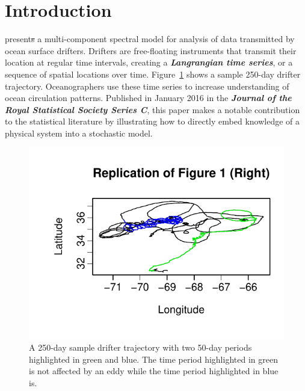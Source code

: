\documentclass{stat572Style}
\newcommand{\vmdel}[1]{\sout{#1}}
\begin{document}
\section{Introduction}
\citet{Sykulski2016} present\vmdel{s} a multi-component spectral model for analysis of data transmitted by ocean surface drifters. 
Drifters are free-floating  instruments that transmit their location at regular time intervals,  creating a \textbf{\it{Langrangian time series}}, or a sequence of spatial locations over time. 
Figure~\ref{fig: fig1} shows a sample 250-day drifter trajectory. 
Oceanographers use these time series to increase understanding of  ocean circulation patterns.
Published in January 2016 in the \textbf{\it{Journal of the Royal Statistical Society Series C}}, this paper makes a notable contribution to the statistical literature by illustrating how to directly embed knowledge of a physical system into a stochastic model. 
 \begin{figure}[h!]
  \centering
    \includegraphics[width=.6\textwidth]{ReplicatedFigures/fig1.pdf}
        \caption{A 250-day sample drifter trajectory with two 50-day periods highlighted in green and blue. The time period highlighted in green is not affected by an eddy while the time period highlighted  in blue is.}
        	\label{fig: fig1}
\end{figure}
 
\end{document}
